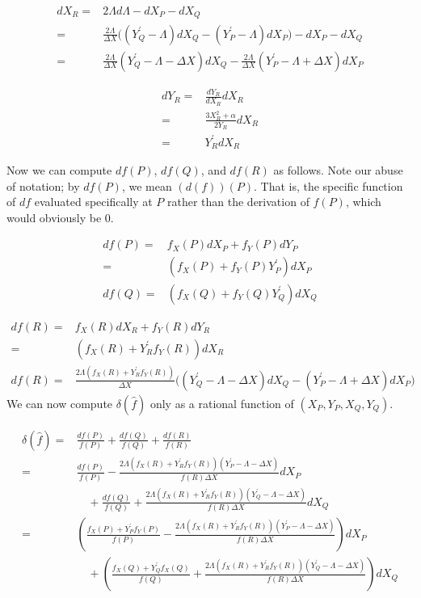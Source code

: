 \documentclass[11pt,letterpaper]{article}
\theoremstyle{definition}
\newcommand{\6}{\mathbf}
\newcommand{\7}{\mathcal}
\begin{document}
\begin{align}
dX_R =& 2\Lambda d\Lambda - dX_P - dX_Q \\
=& \frac{2\Lambda}{\Delta X} \Big( \left(Y_Q^\prime - \Lambda\right)dX_Q - \left(Y_P^\prime - \Lambda\right)dX_P\Big) - dX_P - dX_Q\\
=& \frac{2\Lambda}{\Delta X}\left(Y_Q^\prime-\Lambda - \Delta X\right)dX_Q - \frac{2\Lambda}{\Delta X}\left(Y_P^\prime-\Lambda + \Delta X\right)dX_P \label{dxr}
\end{align}


\begin{align}
dY_R =& \frac{dY_R}{dX_R}dX_R \\
=& \frac{3X_R^2+\alpha}{2Y_R} dX_R \\
=& Y_R^\prime dX_R \label{dyr}
\end{align}

Now we can compute $df(P)$, $df(Q)$, and $df(R)$ as follows. Note our abuse of notation; by $df(P)$, we mean $(d(f))(P)$. That is, the specific function of $df$ evaluated specifically at $P$ rather than the derivation of $f(P)$, which would obviously be 0.

\begin{align}
df(P) =& f_X(P) dX_P + f_Y(P) dY_P\\
=& (f_X(P) + f_Y(P)Y_P^\prime)dX_P \label{dfp}\\
df(Q) =& (f_X(Q) + f_Y(Q)Y_Q^\prime)dX_Q \label{dfq}
\end{align}

\begin{align}
df(R) =& f_X(R)dX_R + f_Y(R) dY_R \\
=& (f_X(R) + Y^\prime_R f_Y(R))dX_R \\
df(R) =& \frac{2\Lambda(f_X(R) + Y^\prime_R f_Y(R))}{\Delta X}\Big(\left(Y_Q^\prime - \Lambda - \Delta X\right) dX_Q  - \left(Y_P^\prime - \Lambda + \Delta X\right)dX_P\Big) \label{dfr}
\end{align}
We can now compute $\delta(\widehat{f})$ only as a rational function of $(X_P, Y_P, X_Q, Y_Q)$. 

\begin{align}
\delta(\widehat{f}) =& \frac{df(P)}{f(P)} + \frac{df(Q)}{f(Q)} + \frac{df(R)}{f(R)}  \\
=& \frac{df(P)}{f(P)}- \frac{2\Lambda(f_X(R) + Y_R^\prime f_Y(R))(Y_P^\prime - \Lambda - \Delta X)}{f(R)\Delta X}dX_P \\& \quad + \frac{df(Q)}{f(Q)} + \frac{2\Lambda(f_X(R) + Y_R^\prime f_Y(R))(Y_Q^\prime - \Lambda - \Delta X)}{f(R) \Delta X}dX_Q \\
=& \left(\frac{f_X(P) + Y_P^\prime f_Y(P)}{f(P)}- \frac{2\Lambda(f_X(R) + Y_R^\prime f_Y(R))(Y_P^\prime - \Lambda - \Delta X)}{f(R)\Delta X}\right)dX_P \\&  \quad + \left(\frac{f_X(Q) + Y_Q^\prime f_X(Q)}{f(Q)} + \frac{2\Lambda(f_X(R) + Y_R^\prime f_Y(R))(Y_Q^\prime - \Lambda - \Delta X)}{f(R) \Delta X}\right)dX_Q  \label{deltawidehatf}
\end{align}
\end{document}
